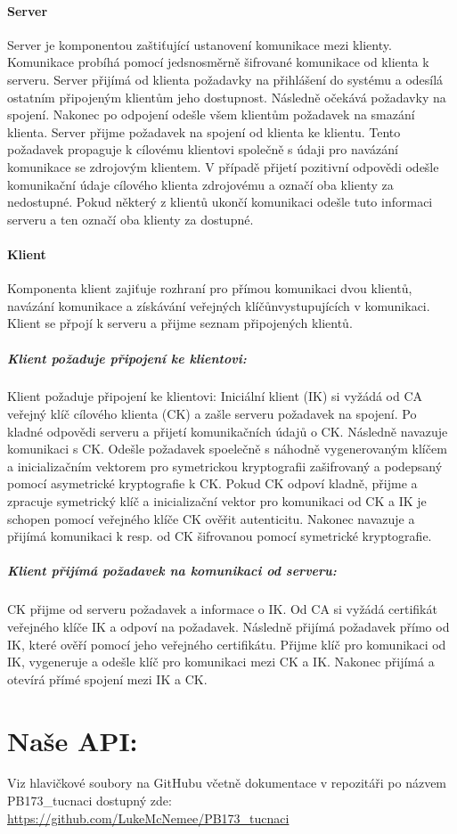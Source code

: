 \documentclass[a4paper, 12pt, titlepage]{article}
\begin{document}
\paragraph{Server}
Server je komponentou zaštiťující ustanovení komunikace mezi klienty. Komunikace 
probíhá pomocí jedsnosměrně šifrované komunikace od klienta k serveru. Server 
přijímá od klienta požadavky na přihlášení do systému a odesílá ostatním 
připojeným klientům jeho dostupnost. Následně očekává požadavky na spojení. 
Nakonec po odpojení odešle všem klientům požadavek na smazání klienta.
Server přijme požadavek na spojení od klienta ke klientu. Tento požadavek 
propaguje
k cílovému klientovi společně s údaji pro navázání komunikace se zdrojovým 
klientem. V případě přijetí pozitivní odpovědi odešle komunikační údaje cílového 
klienta zdrojovému a označí oba klienty za nedostupné. Pokud některý z klientů 
ukončí komunikaci odešle tuto informaci serveru a ten označí oba klienty za 
dostupné.

\paragraph{Klient}
Komponenta klient zajiťuje rozhraní pro přímou komunikaci dvou klientů, navázání 
komunikace a získávání veřejných klíčůnvystupujících v komunikaci. Klient se 
přpojí k serveru a přijme seznam připojených klientů.

\subparagraph{Klient požaduje připojení ke klientovi:}
Klient požaduje připojení ke klientovi:
Iniciální klient (IK) si vyžádá od CA veřejný klíč cílového klienta (CK) 
a zašle serveru požadavek na spojení. Po kladné odpovědi serveru a přijetí 
komunikačních údajů o CK. Následně navazuje komunikaci s CK. Odešle požadavek 
spoelečně s náhodně vygenerovaným klíčem a inicializačním vektorem pro 
symetrickou kryptografii zašifrovaný a podepsaný pomocí asymetrické kryptografie 
k CK. Pokud CK odpoví kladně, přijme a zpracuje symetrický klíč a inicializační 
vektor pro komunikaci od CK a IK je schopen pomocí
veřejného klíče CK ověřit autenticitu. Nakonec navazuje a přijímá 
komunikaci k resp. od CK šifrovanou pomocí
symetrické kryptografie. 

\subparagraph{Klient přijímá požadavek na komunikaci od serveru:}
CK přijme od serveru požadavek a informace o IK. Od CA si vyžádá 
certifikát veřejného klíče IK a odpoví na požadavek. Následně přijímá požadavek 
přímo od IK, které ověří pomocí jeho veřejného certifikátu. Přijme klíč pro 
komunikaci od IK, vygeneruje a odešle klíč pro komunikaci mezi CK a IK. Nakonec 
přijímá a otevírá přímé spojení mezi IK a CK.

\section{Naše API:}

Viz hlavičkové soubory na GitHubu včetně dokumentace v repozitáři po názvem 
PB173\_tucnaci dostupný zde: \url{https://github.com/LukeMcNemee/PB173\_tucnaci}
\end{document}

